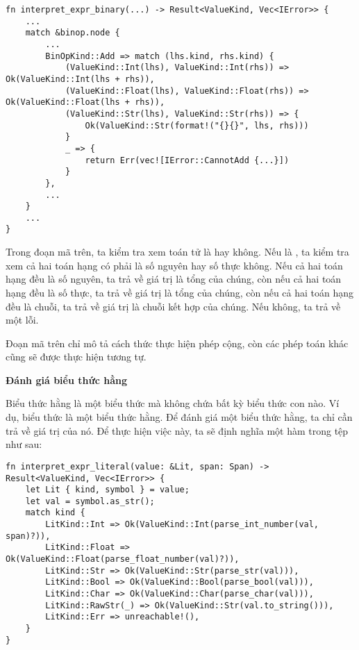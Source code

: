 \begin{lstlisting}[]
fn interpret_expr_binary(...) -> Result<ValueKind, Vec<IError>> {
    ...
    match &binop.node {
        ...
        BinOpKind::Add => match (lhs.kind, rhs.kind) {
            (ValueKind::Int(lhs), ValueKind::Int(rhs)) => Ok(ValueKind::Int(lhs + rhs)),
            (ValueKind::Float(lhs), ValueKind::Float(rhs)) => Ok(ValueKind::Float(lhs + rhs)),
            (ValueKind::Str(lhs), ValueKind::Str(rhs)) => {
                Ok(ValueKind::Str(format!("{}{}", lhs, rhs)))
            }
            _ => {
                return Err(vec![IError::CannotAdd {...}])
            }
        },
        ...
    }
    ...
}
\end{lstlisting}

    Trong đoạn mã trên, ta kiểm tra xem toán tử là \kw{+} hay không. Nếu là \kw{+}, ta kiểm tra xem cả hai toán hạng có phải là số nguyên hay số thực không. Nếu cả hai toán hạng đều là số nguyên, ta trả về giá trị là tổng của chúng, còn nếu cả hai toán hạng đều là số thực, ta trả về giá trị là tổng của chúng, còn nếu cả hai toán hạng đều là chuỗi, ta trả về giá trị là chuỗi kết hợp của chúng. Nếu không, ta trả về một lỗi. 

    Đoạn mã trên chỉ mô tả cách thức thực hiện phép cộng, còn các phép toán khác cũng sẽ được thực hiện tương tự.

\noindent \textbf{Đánh giá biểu thức hằng}

    Biểu thức hằng là một biểu thức mà không chứa bất kỳ biểu thức con nào. Ví dụ, biểu thức  là một biểu thức hằng. Để đánh giá một biểu thức hằng, ta chỉ cần trả về giá trị của nó. Để thực hiện việc này, ta sẽ định nghĩa một hàm  trong tệp  như sau:

\begin{lstlisting}[]
fn interpret_expr_literal(value: &Lit, span: Span) -> Result<ValueKind, Vec<IError>> {
    let Lit { kind, symbol } = value;
    let val = symbol.as_str();
    match kind {
        LitKind::Int => Ok(ValueKind::Int(parse_int_number(val, span)?)),
        LitKind::Float => Ok(ValueKind::Float(parse_float_number(val)?)),
        LitKind::Str => Ok(ValueKind::Str(parse_str(val))),
        LitKind::Bool => Ok(ValueKind::Bool(parse_bool(val))),
        LitKind::Char => Ok(ValueKind::Char(parse_char(val))),
        LitKind::RawStr(_) => Ok(ValueKind::Str(val.to_string())),
        LitKind::Err => unreachable!(),
    }
}
\end{lstlisting}

